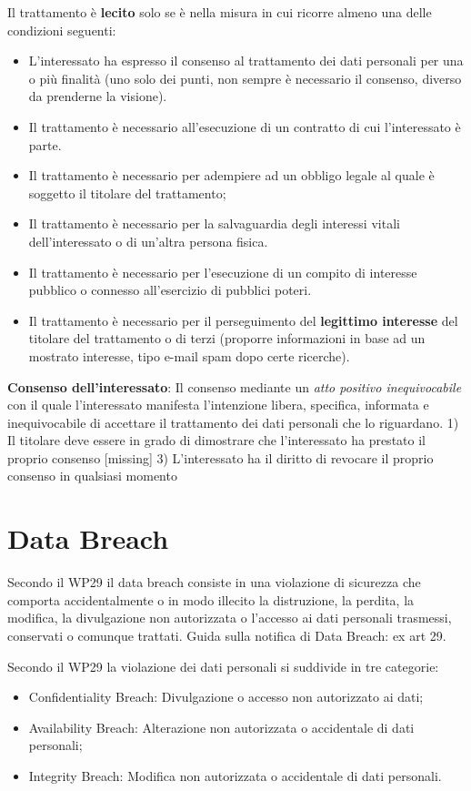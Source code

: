 \documentclass[twocolumn]{article}
\newcommand{\definition}[1]{\begin{mycolorbox}[colback=colorone]
\fontfamily{qcr}\selectfont #1 \fontfamily{cmr}\selectfont
\end{mycolorbox}}
\begin{document}
Il trattamento è \textbf{lecito} solo se è nella misura in cui ricorre almeno una delle condizioni seguenti:
\begin{itemize}
    \item L'interessato ha espresso il consenso al trattamento dei dati personali per una o più finalità (uno solo dei punti, non sempre è necessario il consenso, diverso da prenderne la visione).
    \item Il trattamento è necessario all'esecuzione di un contratto di cui l'interessato è parte.
    \item Il trattamento è necessario per adempiere ad un obbligo legale al quale è soggetto il titolare del trattamento;
    \item Il trattamento è necessario per la salvaguardia degli interessi vitali dell'interessato o di un'altra persona fisica.
    \item Il trattamento è necessario per l'esecuzione di un compito di interesse pubblico o connesso all'esercizio di pubblici poteri.
    \item Il trattamento è necessario per il perseguimento del \textbf{legittimo interesse} del titolare del trattamento o di terzi (proporre informazioni in base ad un mostrato interesse, tipo e-mail spam dopo certe ricerche).
\end{itemize}
\definition{\textbf{Consenso dell'interessato}: Il consenso mediante un \textit{atto positivo inequivocabile} con il quale l'interessato manifesta l'intenzione libera, specifica, informata e inequivocabile di accettare il trattamento dei dati personali che lo riguardano. 1) Il titolare deve essere in grado di dimostrare che l'interessato ha prestato il proprio consenso [missing] 3) L'interessato ha il diritto di revocare il proprio consenso in qualsiasi momento}

\section{Data Breach}
Secondo il WP29 il data breach consiste in una violazione di sicurezza che comporta accidentalmente o in modo illecito la distruzione, la perdita, la modifica, la divulgazione non autorizzata o l'accesso ai dati personali trasmessi, conservati o comunque trattati. Guida sulla notifica di Data Breach: ex art 29.

Secondo il WP29 la violazione dei dati personali si suddivide in tre categorie:\begin{itemize}
    \item Confidentiality Breach: Divulgazione o accesso non autorizzato ai dati;
    \item Availability Breach: Alterazione non autorizzata o accidentale di dati personali;
    \item Integrity Breach: Modifica non autorizzata o accidentale di dati personali.
\end{itemize}
\end{document}
